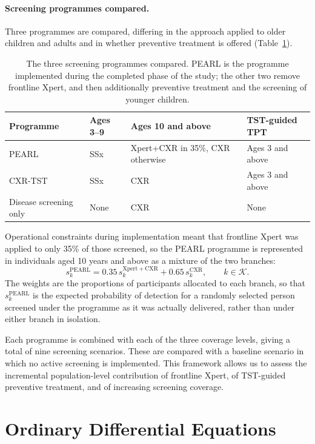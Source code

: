 \documentclass[11pt]{article}
\begin{document}
\paragraph{Screening programmes compared.}
Three programmes are compared, differing in the approach applied to older children and adults and in whether preventive treatment is offered (Table~\ref{tab:programmes}).

\begin{table}[!ht]
\centering
\begin{tabular}{llll}
\toprule
Programme & Ages 3--9 & Ages 10 and above & TST-guided TPT \\
\midrule
PEARL & SSx & Xpert+CXR in 35\%, CXR otherwise & Ages 3 and above \\
CXR-TST & SSx & CXR & Ages 3 and above \\
Disease screening only & None & CXR & None \\
\bottomrule
\end{tabular}
\caption{The three screening programmes compared. PEARL is the programme implemented during the completed phase of the study; the other two remove frontline Xpert, and then additionally preventive treatment and the screening of younger children.}
\label{tab:programmes}
\end{table}

Operational constraints during implementation meant that frontline Xpert was applied to only 35\% of those screened, so the PEARL programme is represented in individuals aged 10 years and above as a mixture of the two branches:
\[
s^{\mathrm{PEARL}}_k = 0.35\, s^{\mathrm{Xpert+CXR}}_k + 0.65\, s^{\mathrm{CXR}}_k,
\qquad k\in\mathcal{K}.
\]
The weights are the proportions of participants allocated to each branch, so that \(s^{\mathrm{PEARL}}_k\) is the expected probability of detection for a randomly selected person screened under the programme as it was actually delivered, rather than under either branch in isolation.

Each programme is combined with each of the three coverage levels, giving a total of nine screening scenarios. These are compared with a baseline scenario in which no active screening is implemented. This framework allows us to assess the incremental population-level contribution of frontline Xpert, of TST-guided preventive treatment, and of increasing screening coverage.

\section{Ordinary Differential Equations}
\label{sec:odes}
\end{document}

